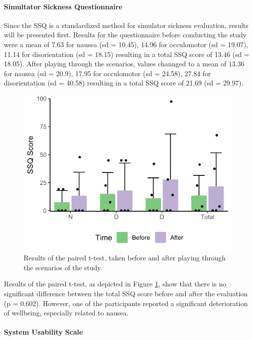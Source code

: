 \paragraph{Simultator Sickness Questionnaire}

Since the SSQ is a standardized method for simulator sickness evaluation, 
results will be presented first.
Results for the questionnaire before conducting the study were a mean of 7.63 for
nausea (sd = 10.45), 14.96 for occulomotor (sd = 19.07),
11.14 for disorientation (sd = 18.15)  resulting in 
a total SSQ score of 13.46 (sd = 18.05).
After playing through the scenarios, values channged to
a mean of 13.36 for
nausea (sd = 20.9), 17.95 for occulomotor (sd = 24.58),
27.84 for disorientation (sd = 40.58) resulting in 
a total SSQ score of 21.69 (sd = 29.97).

\begin{figure}[ht]
    \centering
    \includegraphics[width=0.7\linewidth]{images/evaluation/VR-SSQ.png}
    \caption{\label{fig::ssq}Results of the paired t-test,
    taken before and after playing through the scenarios of the study.}
\end{figure}

Results of the paired t-test, as depicted in Figure \ref{fig::ssq},
show that 
there is no significant difference between the total SSQ 
score before and after the evaluation (p = 0.602).
However, one of the participants reported a significant deterioration
of wellbeing, especially related to nausea.

\paragraph{System Usability Scale}

